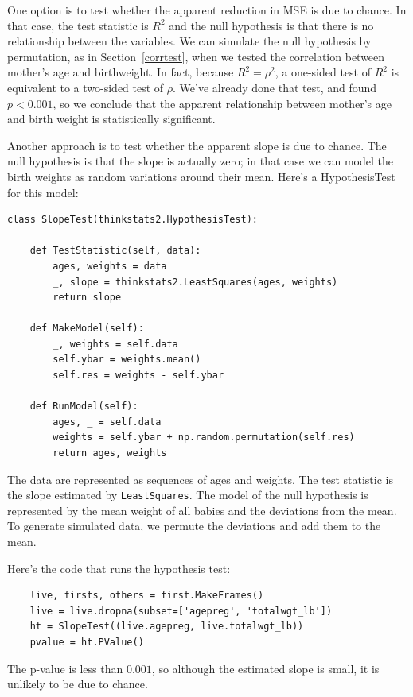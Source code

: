 \documentclass[12pt]{book}
\begin{document}
One option is to test whether the apparent reduction in MSE is due to
chance.  In that case, the test statistic is $R^2$ and the null
hypothesis is that there is no relationship between the variables.  We
can simulate the null hypothesis by permutation, as in
Section~\ref{corrtest}, when we tested the correlation between
mother's age and birthweight.  In fact, because $R^2 = \rho^2$, a
one-sided test of $R^2$ is equivalent to a two-sided test of $\rho$.
We've already done that test, and found $p < 0.001$, so we conclude
that the apparent relationship between mother's age and birth weight
is statistically significant.
  
Another approach is to test whether the apparent slope is due to chance.
The null hypothesis is that the slope is actually zero; in that case
we can model the birth weights as random variations around their mean.
Here's a HypothesisTest for this model:

\begin{verbatim}
class SlopeTest(thinkstats2.HypothesisTest):

    def TestStatistic(self, data):
        ages, weights = data
        _, slope = thinkstats2.LeastSquares(ages, weights)
        return slope

    def MakeModel(self):
        _, weights = self.data
        self.ybar = weights.mean()
        self.res = weights - self.ybar

    def RunModel(self):
        ages, _ = self.data
        weights = self.ybar + np.random.permutation(self.res)
        return ages, weights
\end{verbatim}

The data are represented as sequences of ages and weights.  The
test statistic is the slope estimated by {\tt LeastSquares}.
The model of the null hypothesis is represented by the mean weight
of all babies and the deviations from the mean.  To
generate simulated data, we permute the deviations and add them to
the mean.

Here's the code that runs the hypothesis test:

\begin{verbatim}
    live, firsts, others = first.MakeFrames()
    live = live.dropna(subset=['agepreg', 'totalwgt_lb'])
    ht = SlopeTest((live.agepreg, live.totalwgt_lb))
    pvalue = ht.PValue()
\end{verbatim}

The p-value is less than $0.001$, so although the estimated
slope is small, it is unlikely to be due to chance.
\end{document}
